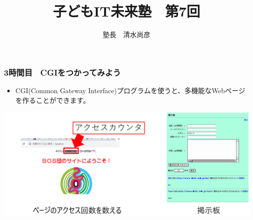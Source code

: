 \documentclass[dvipdfmx]{beamer}
\title{子どもIT未来塾　第7回}
\author{塾長　清水尚彦}
\begin{document}



\begin{frame}[fragile]
	\frametitle{3時間目　CGIをつかってみよう ~~~}
        \begin{itemize}
            \item CGI(Common Gateway Interface)プログラムを使うと、多機能なWebページを作ることができます。
        \end{itemize}
        \begin{minipage}{\textwidth}
            {\upshape
              \includegraphics[width=\textwidth]{slide07-img008.png}}
        \end{minipage}
\end{frame}
\end{document}
